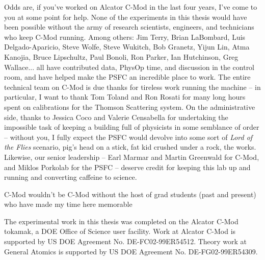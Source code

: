 Odds are, if you've worked on Alcator C-Mod in the last four years, I've come to you at some point for help.  None of the experiments in this thesis would have been possible without the army of research scientists, engineers, and technicians who keep C-Mod running.  Among others: Jim Terry, Brian LaBombard, Luis Delgado-Aparicio, Steve Wolfe, Steve Wukitch, Bob Granetz, Yijun Lin, Atma Kanojia, Bruce Lipschultz, Paul Bonoli, Ron Parker, Ian Hutchinson, Greg Wallace... all have contributed data, PhysOp time, and discussion in the control room, and have helped make the PSFC an incredible place to work.  The entire technical team on C-Mod is due thanks for tireless work running the machine -- in particular, I want to thank Tom Toland and Ron Rosati for many long hours spent on calibrations for the Thomson Scattering system.  On the administrative side, thanks to Jessica Coco and Valerie Censabella for undertaking the impossible task of keeping a building full of physicists in some semblance of order -- without you, I fully expect the PSFC would devolve into some sort of \emph{Lord of the Flies} scenario, pig's head on a stick, fat kid crushed under a rock, the works.  Likewise, our senior leadership -- Earl Marmar and Martin Greenwald for C-Mod, and Miklos Porkolab for the PSFC -- deserve credit for keeping this lab up and running and converting caffeine to science.

C-Mod wouldn't be C-Mod without the host of grad students (past and present) who have made my time here memorable

The experimental work in this thesis was completed on the Alcator C-Mod tokamak, a DOE Office of Science user facility.  Work at Alcator C-Mod is supported by US DOE Agreement No. DE-FC02-99ER54512.  Theory work at General Atomics is supported by US DOE Agreement No. DE-FG02-99ER54309.